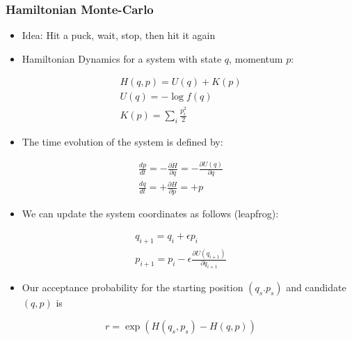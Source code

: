 \documentclass{beamer}
\begin{document}
\begin{frame}
  \frametitle{Hamiltonian Monte-Carlo}
  \begin{itemize}
    \item Idea: Hit a puck, wait, stop, then hit it again
    \item Hamiltonian Dynamics for a system with state $q$, momentum $p$:
  \end{itemize}
  \begin{gather*}
    H(q, p) = U(q) + K(p) \\
    U(q) = - \log f(q) \\
    K(p) = \sum_i \frac{p_i^2}{2}
  \end{gather*}
  \begin{itemize}
    \item The time evolution of the system is defined by:
  \end{itemize}
  \begin{gather*}
    \frac{d p}{d t} = - \frac{\partial H}{\partial q} = - \frac{\partial U(q)}{\partial q} \\
    \frac{d q}{d t} = +\frac{\partial H}{\partial p} = +p
  \end{gather*}
  \begin{itemize}
    \item We can update the system coordinates as follows (leapfrog):
  \end{itemize}
  \begin{gather*}
    q_{i+1} = q_i + \epsilon p_i \\
    p_{i+1} = p_i - \epsilon \frac{\partial U(q_{i+1})}{\partial q_{i+1}}
  \end{gather*}
  \begin{itemize}
    \item Our acceptance probability for the starting position $(q_s. p_s)$ and candidate $(q, p)$ is
  \end{itemize}
  \begin{equation*}
    r = \exp \left( H(q_s, p_s) - H(q, p) \right)
  \end{equation*}

\end{frame}
\end{document}
